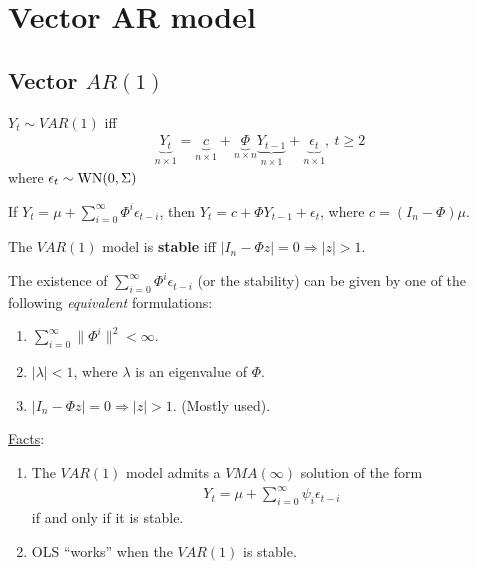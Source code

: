 \documentclass[11pt]{elegantbook}
\begin{document}
\section{Vector AR model}
\subsection{Vector $AR(1)$}
\begin{definition}[Vector $AR(1)$]
    $Y_t\sim VAR(1)$ iff
    \begin{equation}
        \begin{aligned}
            \underbrace{Y_t}_{n\times 1}=\underbrace{c}_{n\times 1}+\underbrace{\Phi}_{n\times n} \underbrace{Y_{t-1}}_{n\times 1} + \underbrace{\epsilon_t}_{n\times 1},\ t\geq 2
        \end{aligned}
        \nonumber
    \end{equation}
    where $\epsilon_t\sim \textnormal{WN}(0,\Sigma)$
\end{definition}

\begin{lemma}
    If $Y_t=\mu+\sum_{i=0}^\infty\Phi^i\epsilon_{t-i}$, then $Y_t=c+\Phi Y_{t-1} + \epsilon_t$, where $c=(I_n-\Phi)\mu$.
\end{lemma}


\begin{definition}
    The $VAR(1)$ model is \textbf{stable} iff $|I_n-\Phi z|=0 \Rightarrow |z|>1$.
\end{definition}
\begin{lemma}\label{lemma:eqv_stability}
    The existence of $\sum_{i=0}^\infty\Phi^i\epsilon_{t-i}$ (or the stability) can be given by one of the following \textit{equivalent} formulations:
    \begin{enumerate}
        \item $\sum_{i=0}^\infty\|\Phi^i\|^2<\infty$.
        \item $|\lambda|<1$, where $\lambda$ is an eigenvalue of $\Phi$.
        \item $|I_n-\Phi z|=0 \Rightarrow |z|>1$. (Mostly used).
    \end{enumerate}
\end{lemma}

\underline{Facts}:
\begin{enumerate}
    \item The $VAR(1)$ model admits a $VMA(\infty)$ solution of the form
    \begin{equation}
        \begin{aligned}
            Y_t=\mu+\sum_{i=0}^\infty\psi_i\epsilon_{t-i}
        \end{aligned}
        \nonumber
    \end{equation}
    if and only if it is stable.
    \item OLS ``works'' when the $VAR(1)$ is stable.
\end{enumerate}
\end{document}
